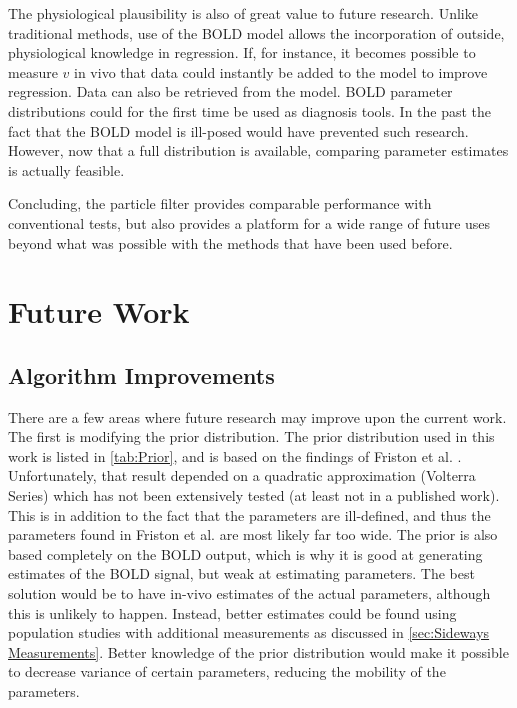 The physiological plausibility is also of great value to future
research. Unlike traditional methods, use of the \ac{BOLD} model allows
the incorporation of outside, physiological knowledge in regression.
If, for instance, it becomes possible to measure $v$ in vivo that data
could instantly be added to the model to improve regression. Data can
also be retrieved from the model. \ac{BOLD} parameter distributions could
for the first time be used as diagnosis tools. In the past the fact
that the BOLD model is ill-posed would have prevented such research. 
However, now that a full
distribution is available, comparing parameter estimates is actually
feasible.

Concluding, the particle filter provides comparable performance with
conventional tests, but also provides a platform for a wide range of
future uses beyond what was possible with the methods that have been
used before.

\section{Future Work}
\label{sec:FutureWork}
\subsection{Algorithm Improvements}
\label{sec:Particle Filter Variations}
There are a few areas where future research may improve upon the current
work. The first is modifying the prior
distribution. The prior distribution used in this work is listed in \autoref{tab:Prior},
and is based on the findings of Friston et al. \cite{Friston2002b}. Unfortunately, that
result depended on a quadratic approximation (Volterra Series) which has
not been extensively tested (at least not in a published work).
This is in addition to the fact that the parameters are ill-defined, and
thus the parameters found in Friston et al. \cite{Friston2002b} are most likely far too wide.
The prior is also
based completely on the \ac{BOLD} output, which is why it is good at generating
estimates of the \ac{BOLD} signal, but weak at estimating parameters.
The best solution would be to have
in-vivo estimates of the actual parameters, although this
is unlikely to happen. Instead, better estimates could be found
using population studies with additional measurements as discussed in
\autoref{sec:Sideways Measurements}. Better knowledge of the prior distribution
would make it possible to decrease variance of certain
parameters, reducing the mobility of the parameters.

